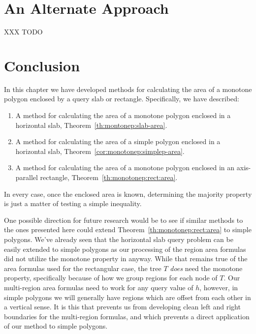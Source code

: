\section{An Alternate Approach}
\label{:monotonep:alt}

XXX TODO


\section{Conclusion}
\label{:monotonep:concl}

In this chapter we have developed methods for calculating the area of a monotone polygon enclosed by a query slab or rectangle.  Specifically, we have described:

\begin{enumerate}
\item A method for calculating the area of a monotone polygon enclosed in a horizontal slab, Theorem~\ref{th:montonep:slab-area}.

\item A method for calculating the area of a simple polygon enclosed in a horizontal slab, Theorem~\ref{cor:monotonep:simplep-area}.

\item A method for calculating the area of a monotone polygon enclosed in an axis-parallel rectangle, Theorem~\ref{th:monotonep:rect:area}.

\end{enumerate}

In every case, once the enclosed area is known, determining the majority property is just a matter of testing a simple inequality.

One possible direction for future research would be to see if similar methods to the ones presented here could extend Theorem~\ref{th:monotonep:rect:area} to simple polygons. We've already seen that the horizontal slab query problem can be easily extended to simple polygons as our processing of the region area formulas did not utilize the monotone property in anyway. While that remains true of the area formulas used for the rectangular case, the tree $T$ \emph{does} need the monotone property, specifically because of how we group regions for each node of $T$. Our multi-region area formulas need to work for any query value of $h$, however, in simple polygons we will generally have regions which are offset from each other in a vertical sense. It is this that prevents us from developing clean left and right boundaries for the multi-region formulas, and which prevents a direct application of our method to simple polygons.

